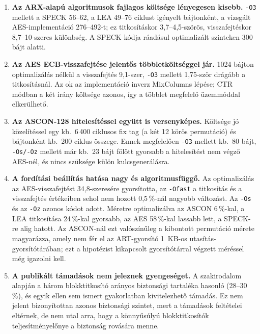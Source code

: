 \documentclass[a4paper,12pt]{report}
\theoremstyle{definition}
\theoremstyle{remark}
\begin{document}
\begin{enumerate}
\item \textbf{Az ARX-alapú algoritmusok fajlagos költsége lényegesen kisebb.} \texttt{-O3} mellett a SPECK 56--62, a LEA 49--76 ciklust igényelt bájtonként, a vizsgált AES-implementáció 276--492-t; ez titkosításkor 3,7--4,5-szörös, visszafejtéskor 8,7--10-szeres különbség. A SPECK kódja ráadásul optimalizált szinteken 300 bájt alatti.

\item \textbf{Az AES ECB-visszafejtése jelentős többletköltséggel jár.} 1024 bájton optimalizálás nélkül a visszafejtés 9,1-szer, \texttt{-O3} mellett 1,75-ször drágább a titkosításnál. Az ok az implementáció inverz MixColumns lépése; CTR módban a két irány költsége azonos, így a többlet megfelelő üzemmóddal elkerülhető.

\item \textbf{Az ASCON-128 hitelesítéssel együtt is versenyképes.} Költsége jó közelítéssel egy kb.\ 6\,400 ciklusos fix tag (a két 12 körös permutáció) és bájtonként kb.\ 200 ciklus összege. Ennek megfelelően \texttt{-O3} mellett kb.\ 80 bájt, \texttt{-Os/-Oz} mellett már kb.\ 23 bájt fölött gyorsabb a hitelesítést nem végző AES-nél, és nincs szüksége külön kulcsgenerálásra.

\item \textbf{A fordítási beállítás hatása nagy és algoritmusfüggő.} Az optimalizálás az AES-visszafejtést 34,8-szeresére gyorsította, az \texttt{-Ofast} a titkosítás és a visszafejtés értékeiben sehol nem hozott 0,5\,\%-nál nagyobb változást. Az \texttt{-Os} és az \texttt{-Oz} azonos kódot adott. Méretre optimalizálva az ASCON 6\,\%-kal, a LEA titkosítása 24\,\%-kal gyorsabb, az AES 58\,\%-kal lassabb lett, a SPECK-re alig hatott. Az ASCON-nál ezt valószínűleg a kibontott permutáció mérete magyarázza, amely nem fér el az ART-gyorsító 1~KB-os utasítás-gyorsítótárában; ezt a hipotézist kikapcsolt gyorsítótárral végzett méréssel még igazolni kell.

\item \textbf{A publikált támadások nem jeleznek gyengeséget.} A szakirodalom alapján a három blokktitkosító arányos biztonsági tartaléka hasonló (28--30\,\%), és egyik ellen sem ismert gyakorlatban kivitelezhető támadás. Ez nem jelent bizonyítottan azonos biztonsági szintet, mert a támadások feltételei eltérnek, de nem utal arra, hogy a könnyűsúlyú blokktitkosítók teljesítményelőnye a biztonság rovására menne.
\end{enumerate}
\end{document}
